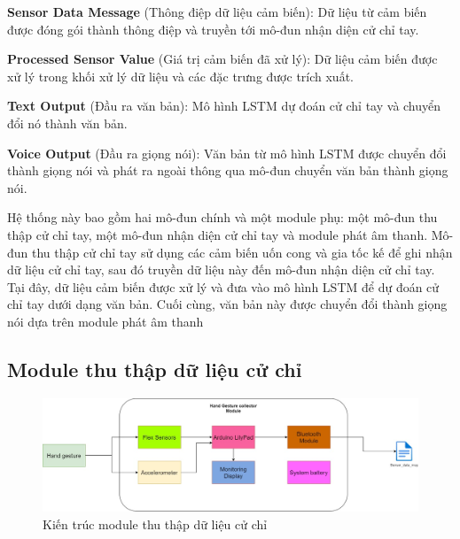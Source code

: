 \textbf{Sensor Data Message }(Thông điệp dữ liệu cảm biến): Dữ liệu từ cảm biến được đóng gói thành thông điệp và truyền tới mô-đun nhận diện cử chỉ tay.\

\textbf{Processed Sensor Value} (Giá trị cảm biến đã xử lý): Dữ liệu cảm biến được xử lý trong khối xử lý dữ liệu và các đặc trưng được trích xuất.\

\textbf{Text Output} (Đầu ra văn bản): Mô hình LSTM dự đoán cử chỉ tay và chuyển đổi nó thành văn bản.\

\textbf{Voice Output} (Đầu ra giọng nói): Văn bản từ mô hình LSTM được chuyển đổi thành giọng nói và phát ra ngoài thông qua mô-đun chuyển văn bản thành giọng nói.\


Hệ thống này bao gồm hai mô-đun chính và một module phụ: một mô-đun thu thập cử chỉ tay, một mô-đun nhận diện cử chỉ tay và module phát âm thanh. Mô-đun thu thập cử chỉ tay sử dụng các cảm biến uốn cong và gia tốc kế để ghi nhận dữ liệu cử chỉ tay, sau đó truyền dữ liệu này đến mô-đun nhận diện cử chỉ tay. Tại đây, dữ liệu cảm biến được xử lý và đưa vào mô hình LSTM để dự đoán cử chỉ tay dưới dạng văn bản. Cuối cùng, văn bản này được chuyển đổi thành giọng nói dựa trên module phát âm thanh


\subsection{Module thu thập dữ liệu cử chỉ}
\begin{figure}[H]
    \centering
    \includegraphics[width=\textwidth,height=\textheight,keepaspectratio]{Images/Theoretical basis/HandGestureCollector.jpg}
    \caption{Kiến trúc module thu thập dữ liệu cử chỉ}
    \label{fig:enter-label}
\end{figure}

